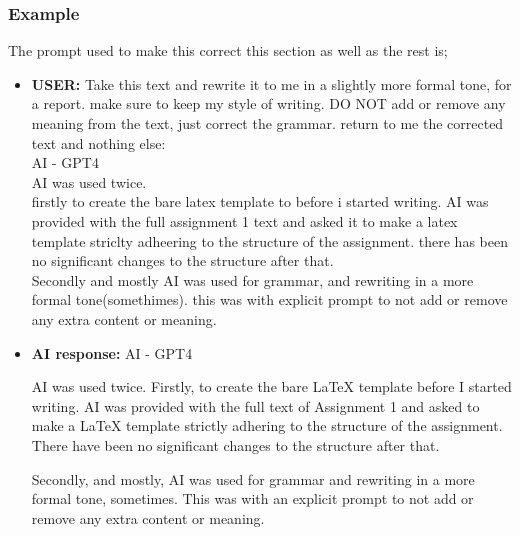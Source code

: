 \documentclass[11pt, a4paper]{article}
\begin{document}
\subsubsection*{Example}
The prompt used to make this correct this section as well as the rest is;
\begin{itemize}
  \item \textbf{USER:} Take this text and rewrite it to me in a slightly more formal tone, for a report. make sure to keep my style of writing. DO NOT add or remove any meaning from the text, just correct the grammar. return to me the corrected text and nothing else: \\
  
  AI - GPT4 \\
  AI was used twice. \\
  firstly to create the bare latex template to before i started writing. AI was provided with the full assignment 1 text and asked it to make a latex template striclty adheering to the structure of the assignment. there has been no significant changes to the structure after that.\\

  Secondly and mostly AI was used for grammar, and rewriting in a more formal tone(somethimes). this was with explicit prompt to not add or remove any extra content or meaning.
  \item \textbf{AI response:} AI - GPT4

  AI was used twice. Firstly, to create the bare LaTeX template before I started writing. AI was provided with the full text of Assignment 1 and asked to make a LaTeX template strictly adhering to the structure of the assignment. There have been no significant changes to the structure after that.
  
  Secondly, and mostly, AI was used for grammar and rewriting in a more formal tone, sometimes. This was with an explicit prompt to not add or remove any extra content or meaning.
  \end{itemize}
\end{document}
